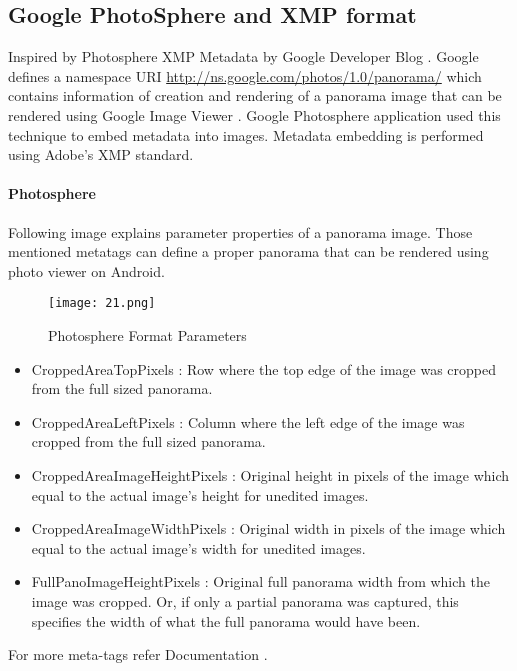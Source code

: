 \subsection{Google PhotoSphere and XMP format}
Inspired by Photosphere XMP Metadata by Google Developer Blog \cite{photosphere}.
Google defines a namespace URI \url{http://ns.google.com/photos/1.0/panorama/} which contains information of creation and rendering of a panorama image that can be rendered using Google Image Viewer \cite{google}. Google Photosphere application used this technique to embed metadata into images. Metadata embedding is performed using Adobe's XMP standard.

\paragraph*{\textbf{Photosphere}}
Following image explains parameter properties of a panorama image. Those mentioned metatags can define a proper panorama that can be rendered using photo viewer on Android.

\begin{figure}[htbp]
\sidecaption
\texttt{[image: 21.png]}
\caption{Photosphere Format Parameters}
\label{Fig_21_params}       %
\end{figure}

\begin{itemize}
\item CroppedAreaTopPixels : Row where the top edge of the image was cropped from the full sized panorama.
\item CroppedAreaLeftPixels : Column where the left edge of the image was cropped from the full sized panorama.
\item CroppedAreaImageHeightPixels : Original height in pixels of the image which equal to the actual image's height for unedited images.
\item CroppedAreaImageWidthPixels : Original width in pixels of the image which equal to the actual image's width for unedited images.
\item FullPanoImageHeightPixels : Original full panorama width from which the image was cropped. Or, if only a partial panorama was captured, this specifies the width of what the full panorama would have been.
\end{itemize}

For more meta-tags refer Documentation \cite{photosphere}.

